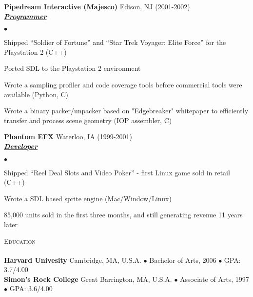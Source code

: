 \documentclass{article}
\newcommand{\lineunder}{\vspace*{-8pt} \\ \hspace*{-18pt} \hrulefill \\}
\newcommand{\header}[1]{{\hspace*{-15pt}\vspace*{6pt} \textsc{#1}} \vspace*{-6pt} \lineunder}
\newcommand{\employer}[4]{{ \textbf{#1} #2 (#3)\\ \underline{\textbf{\emph{#4}}}\\  }}
\newenvironment{achievements}{\begin{list}{$\bullet$}{\topsep 0pt \itemsep -2pt}}{\vspace*{4pt}\end{list}}
\newcommand{\school}[4]{
 \textbf{#1} #2 $\bullet$ #3 $\bullet$ #4\\
}
\begin{document}
	\employer{Pipedream Interactive (Majesco)}		{Edison, NJ}	{2001-2002}	{Programmer}
	\begin{achievements}
	\item  Shipped “Soldier of Fortune” and “Star Trek Voyager: Elite Force” for the Playstation 2 (C++)
	\item Ported SDL to the Playstation 2 environment
	\item Wrote a sampling profiler and code coverage tools before commercial tools were available (Python, C)
	\item Wrote a binary packer/unpacker based on "Edgebreaker" whitepaper to efficiently transfer  and process scene geometry (IOP assembler, C)
	\end{achievements}
	
	\employer{Phantom EFX}		{Waterloo, IA}	{1999-2001}	{Developer}
	\begin{achievements}
	\item Shipped “Reel Deal Slots and Video Poker”  - first Linux game sold in retail (C++)
	\item Wrote a SDL based sprite engine (Mac/Window/Linux)
	\item 85,000 units sold in the first three months, and still generating revenue 11 years later
	\end{achievements}

\header{Education}

\school{Harvard Univesity}{Cambridge, MA, U.S.A.}{Bachelor of Arts, 2006}{GPA: 3.7/4.00}
\school{Simon's Rock College}{Great Barrington, MA, U.S.A.}{Associate of Arts, 1997}{GPA: 3.6/4.00}
\end{document}
